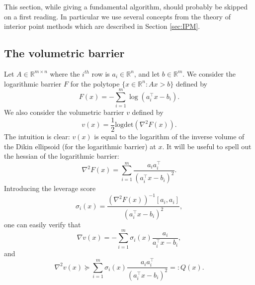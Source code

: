 This section, while giving a fundamental algorithm, should probably be skipped on a first reading. In particular we use several concepts from the theory of interior point methods which are described in Section \ref{sec:IPM}.

\subsection{The volumetric barrier}
Let $A \in \mathbb{R}^{m \times n}$ where the $i^{th}$ row is $a_i \in \mathbb{R}^n$, and let $b \in \mathbb{R}^m$. We consider the logarithmic barrier $F$ for the polytope $\{x \in \mathbb{R}^n : A x > b\}$ defined by
$$F(x) = - \sum_{i=1}^m \log(a_i^{\top} x - b_i) .$$
We also consider the volumetric barrier $v$ defined by
$$v(x) = \frac{1}{2} \mathrm{logdet}(\nabla^2 F(x) ) .$$
The intuition is clear: $v(x)$ is equal to the logarithm of the inverse volume of the Dikin ellipsoid (for the logarithmic barrier) at $x$. It will be useful to spell out the hessian of the logarithmic barrier:
$$\nabla^2 F(x) = \sum_{i=1}^m \frac{a_i a_i^{\top}}{(a_i^{\top} x - b_i)^2} .$$
Introducing the leverage score
$$\sigma_i(x) = \frac{(\nabla^2 F(x) )^{-1}[a_i, a_i]}{(a_i^{\top} x - b_i)^2} ,$$
one can easily verify that
\begin{equation} \label{eq:gradvol}
\nabla v(x) = - \sum_{i=1}^m \sigma_i(x) \frac{a_i}{a_i^{\top} x - b_i} ,
\end{equation}
and 
\begin{equation} \label{eq:hessianvol}
\nabla^2 v(x) \succeq \sum_{i=1}^m \sigma_i(x) \frac{a_i a_i^{\top}}{(a_i^{\top} x - b_i)^2} =: Q(x) .
\end{equation}

